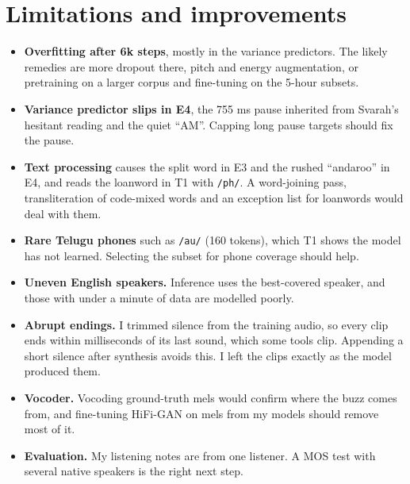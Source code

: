 \documentclass[11pt,a4paper]{article}
\newcommand{\ph}[1]{\texttt{/#1/}}
\begin{document}
\section{Limitations and improvements}
\begin{itemize}
\item \textbf{Overfitting after 6k steps}, mostly in the variance predictors. The likely remedies are more dropout there,
  pitch and energy augmentation, or pretraining on a larger corpus and fine-tuning on the 5-hour subsets.
\item \textbf{Variance predictor slips in E4}, the 755 ms pause inherited from Svarah's hesitant reading and the
  quiet “AM”. Capping long pause targets should fix the pause.
\item \textbf{Text processing} causes the split word in E3 and the rushed “andaroo” in E4, and reads the
  loanword in T1 with \ph{ph}. A word-joining pass, transliteration of code-mixed words and an exception list for
  loanwords would deal with them.
\item \textbf{Rare Telugu phones} such as \ph{au} (160 tokens), which T1 shows the model has not learned.
  Selecting the subset for phone coverage should help.
\item \textbf{Uneven English speakers.} Inference uses the best-covered speaker, and those with under a minute of
  data are modelled poorly.
\item \textbf{Abrupt endings.} I trimmed silence from the training audio, so every clip ends within milliseconds
  of its last sound, which some tools clip. Appending a short silence after synthesis avoids this. I left the clips
  exactly as the model produced them.
\item \textbf{Vocoder.} Vocoding ground-truth mels would confirm where the buzz comes from, and fine-tuning
  HiFi-GAN on mels from my models should remove most of it.
\item \textbf{Evaluation.} My listening notes are from one listener. A MOS test with several native speakers is
  the right next step.
\end{itemize}

\end{document}
